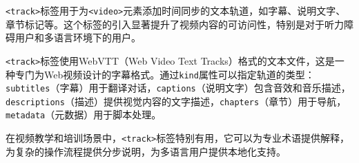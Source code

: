 \texttt{\textless{}track\textgreater{}}标签用于为\texttt{\textless{}video\textgreater{}}元素添加时间同步的文本轨道，如字幕、说明文字、章节标记等。这个标签的引入显著提升了视频内容的可访问性，特别是对于听力障碍用户和多语言环境下的用户。

\texttt{\textless{}track\textgreater{}}标签使用WebVTT（Web Video Text Tracks）格式的文本文件，这是一种专门为Web视频设计的字幕格式。通过\texttt{kind}属性可以指定轨道的类型：\texttt{subtitles}（字幕）用于翻译对话，\texttt{captions}（说明文字）包含音效和音乐描述，\texttt{descriptions}（描述）提供视觉内容的文字描述，\texttt{chapters}（章节）用于导航，\texttt{metadata}（元数据）用于脚本处理。

在视频教学和培训场景中，\texttt{\textless{}track\textgreater{}}标签特别有用，它可以为专业术语提供解释，为复杂的操作流程提供分步说明，为多语言用户提供本地化支持。

\begin{Shaded}
\begin{Highlighting}[]
\DataTypeTok{\textless{}}\DataTypeTok{\textgreater{}}
    \DataTypeTok{\textless{}}\OperatorTok{=}\OperatorTok{=}\DataTypeTok{\textgreater{}}
    \DataTypeTok{\textless{}}\OperatorTok{=}\OtherTok{ }
\OperatorTok{=}\OtherTok{ }
\OperatorTok{=}\OtherTok{ }
\OperatorTok{=}\OtherTok{ }
\DataTypeTok{\textgreater{}}
    \DataTypeTok{\textless{}}\OperatorTok{=}\OtherTok{ }
\OperatorTok{=}\OtherTok{ }
\OperatorTok{=}\OtherTok{ }
\OperatorTok{=}\DataTypeTok{\textgreater{}}
    \DataTypeTok{\textless{}}\OperatorTok{=}\OtherTok{ }
\OperatorTok{=}\OtherTok{ }
\OperatorTok{=}\OtherTok{ }
\OperatorTok{=}\DataTypeTok{\textgreater{}}
\DataTypeTok{\textless{}/}\DataTypeTok{\textgreater{}}
\end{Highlighting}
\end{Shaded}

